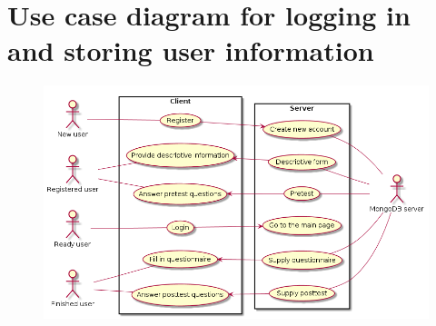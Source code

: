 \section{Use case diagram for logging in and storing user information}
\label{app:loginusecase}
\begin{figure}[h!]
\centering
\includegraphics[width=\textwidth]{img/loginusecase.png}
\end{figure}
